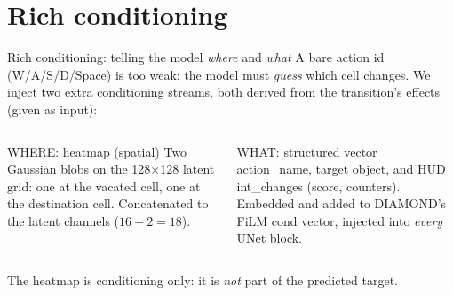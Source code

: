 \documentclass[aspectratio=169,11pt]{beamer}
\newcommand{\code}[1]{{\ttfamily\small #1}}
\newcommand{\good}[1]{\textcolor{good}{#1}}
\newcommand{\bad}[1]{\textcolor{acc}{#1}}
\newcommand{\slate}[1]{\textcolor{slate}{#1}}
\begin{document}
%
\section{Rich conditioning}

\begin{frame}{Rich conditioning: telling the model \emph{where} and \emph{what}}
  \centering
  A bare action id (\code{W/A/S/D/Space}) is too weak: the model must \emph{guess}
  which cell changes. We inject two extra conditioning streams, both derived from
  the transition's \code{effects} (given as input):
  \vspace{0.4em}
  \begin{columns}[T]
      \begin{block}{\good{WHERE}: heatmap (spatial)}
        \scriptsize Two Gaussian blobs on the 128$\times$128 latent grid:
        one at the \bad{vacated} cell, one at the \good{destination} cell.
        \alert{Concatenated} to the latent channels ($16{+}2{=}18$).
      \end{block}
      \begin{block}{\slate{WHAT}: structured vector}
        \scriptsize \code{action\_name}, \code{target} object, and HUD
        \code{int\_changes} (score, counters). Embedded and added to
        DIAMOND's FiLM cond vector, injected into \emph{every} UNet block.
      \end{block}
  \end{columns}
  \vspace{0.3em}
  {\scriptsize The heatmap is conditioning only: it is \emph{not} part of the
  predicted target.}
\end{frame}
\end{document}
